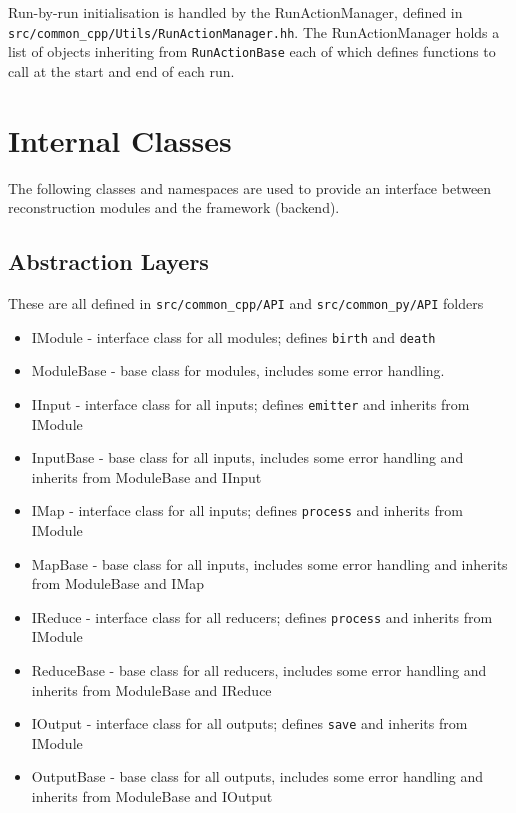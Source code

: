 Run-by-run initialisation is handled by the RunActionManager, defined in \verb|src/common_cpp/Utils/RunActionManager.hh|. The RunActionManager holds a list of objects inheriting from \verb|RunActionBase| each of which defines functions to call at the start and end of each run.

\section{Internal Classes}
The following classes and namespaces are used to provide an interface between
reconstruction modules and the framework (backend).

\subsection{Abstraction Layers}
These are all defined in \verb|src/common_cpp/API| and \verb|src/common_py/API|
folders

\begin{itemize}
\item IModule - interface class for all modules; defines \verb|birth| and 
\verb|death|
\item ModuleBase - base class for modules, includes some error handling.
\item IInput - interface class for all inputs; defines \verb|emitter| and 
              inherits from IModule
\item InputBase - base class for all inputs, includes some error handling and
             inherits from ModuleBase and IInput
\item IMap - interface class for all inputs; defines \verb|process| and 
              inherits from IModule
\item MapBase - base class for all inputs, includes some error handling and 
              inherits from ModuleBase and IMap
\item IReduce - interface class for all reducers; defines \verb|process| and 
              inherits from IModule
\item ReduceBase - base class for all reducers, includes some error handling and
              inherits from ModuleBase and IReduce
\item IOutput - interface class for all outputs; defines \verb|save| and 
              inherits from IModule
\item OutputBase - base class for all outputs, includes some error handling and 
              inherits from ModuleBase and IOutput
\end{itemize}

